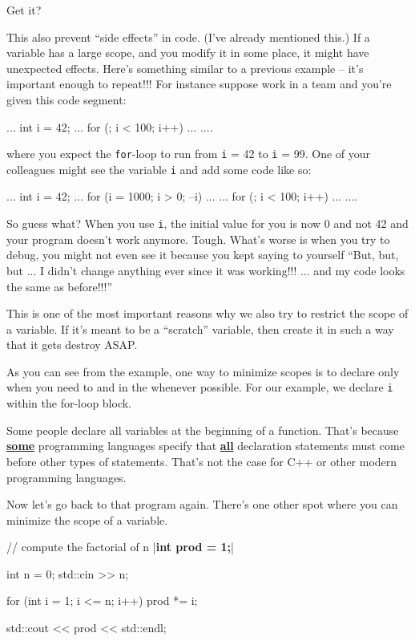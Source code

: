Get it?

This also prevent ``side effects'' in code. (I've already mentioned this.) If a variable has a large scope, and you modify it in some place, it might have unexpected effects. Here's something similar to a previous example -- it's important enough to repeat!!! For instance suppose work in a team and you're given this code segment:

\begin{console}
...
int i = 42;
...
for (; i < 100; i++)
{
    ...
}
.... 
\end{console}

where you expect the \texttt{for}-loop to run from \texttt{i} = 42 to \texttt{i} = 99. One of your colleagues might see the variable \texttt{i} and add some code like so:

\begin{console}
...
int i = 42;
...
for (i = 1000; i > 0; --i)
{    
     ...
}
...
for (; i < 100; i++)
{     
     ...
}
.... 
\end{console}

So guess what? When you use \texttt{i}, the initial value for you is now 0 and not 42 and your program doesn't work anymore. Tough. What's worse is when you try to debug, you might not even see it because you kept saying to yourself ``But, but, but ... I didn't change anything ever since it was working!!! ... and my code looks the same as before!!!''

This is one of the most important reasons why we also try to restrict the scope of a variable. If it's meant to be a ``scratch'' variable, then create it in such a way that it gets destroy ASAP.

As you can see from the example, one way to minimize scopes is to declare only when you need to and in the  whenever possible. For our example, we declare \texttt{i} within the for-loop block.

Some people declare all variables at the beginning of a function. That's because \underline{\textbf{some}} programming languages specify that \underline{\textbf{all}} declaration statements must come before other types of statements.
That's not the case for C++ or other modern programming languages.

Now let's go back to that program again. There's one other spot where you can minimize the scope of a variable.

\begin{consolethree}[escapeinside=||]
// compute the factorial of n
|\textbf{int prod = 1;}|

int n = 0;
std::cin >> n;

for (int i = 1; i <= n; i++)
{    
     prod *= i;
}

std::cout << prod << std::endl;
\end{consolethree}


